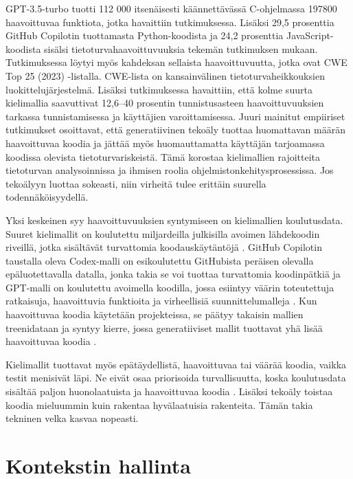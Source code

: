 \documentclass[utf8,bachelor]{gradu3}
\begin{document}
GPT-3.5-turbo tuotti 112 000 itsenäisesti käännettävässä C-ohjelmassa 197800 haavoittuvaa funktiota, jotka havaittiin \textcite{tihanyi_formai_2023} tutkimuksessa. Lisäksi 29,5 prosenttia GitHub Copilotin tuottamasta Python-koodista ja 24,2 prosenttia JavaScript-koodista sisälsi tietoturvahaavoittuvuuksia \textcite{fu_security_2025} tekemän tutkimuksen mukaan. Tutkimuksessa löytyi myös kahdeksan sellaista haavoittuvuutta, jotka ovat CWE Top 25 (2023) -listalla. CWE-lista on kansainvälinen tietoturvaheikkouksien luokittelujärjestelmä. Lisäksi \textcite{sajadi_llms_2025} tutkimuksessa havaittiin, että kolme suurta kielimallia saavuttivat 12,6–40 prosentin tunnistusasteen haavoittuvuuksien tarkassa tunnistamisessa ja käyttäjien varoittamisessa. Juuri mainitut empiiriset tutkimukset osoittavat, että generatiivinen tekoäly tuottaa huomattavan määrän haavoittuvaa koodia ja jättää myös huomauttamatta käyttäjän tarjoamassa koodissa olevista tietoturvariskeistä. Tämä korostaa kielimallien rajoitteita tietoturvan analysoinnissa ja ihmisen roolia ohjelmistonkehitysprosessissa. Jos tekoälyyn luottaa sokeasti, niin virheitä tulee erittäin suurella todennäköisyydellä. 

Yksi keskeinen syy haavoittuvuuksien syntymiseen on kielimallien koulutusdata. Suuret kielimallit on koulutettu miljardeilla julkisilla avoimen lähdekoodin riveillä, jotka sisältävät turvattomia koodauskäytäntöjä \parencite{fu_security_2025}. GitHub Copilotin taustalla oleva Codex-malli on esikoulutettu GitHubista peräisen olevalla epäluotettavalla datalla, jonka takia se voi tuottaa turvattomia koodinpätkiä ja GPT-malli on koulutettu avoimella koodilla, jossa esiintyy väärin toteutettuja ratkaisuja, haavoittuvia funktioita ja virheellisiä suunnittelumalleja \parencite{fu_security_2025, tihanyi_formai_2023}.  Kun haavoittuvaa koodia käytetään projekteissa, se päätyy takaisin mallien treenidataan ja syntyy kierre, jossa generatiiviset mallit tuottavat yhä lisää haavoittuvaa koodia \parencite{fu_security_2025}. 

Kielimallit tuottavat myös epätäydellistä, haavoittuvaa tai väärää koodia, vaikka testit menisivät läpi. Ne eivät osaa priorisoida turvallisuutta, koska koulutusdata sisältää paljon huonolaatuista ja haavoittuvaa koodia \parencite{gu_challenges_2025}. Lisäksi tekoäly toistaa koodia mieluummin kuin rakentaa hyvälaatuisia rakenteita. \parencite{gu_challenges_2025} Tämän takia tekninen velka kasvaa nopeasti.

\section{Kontekstin hallinta}
\end{document}
